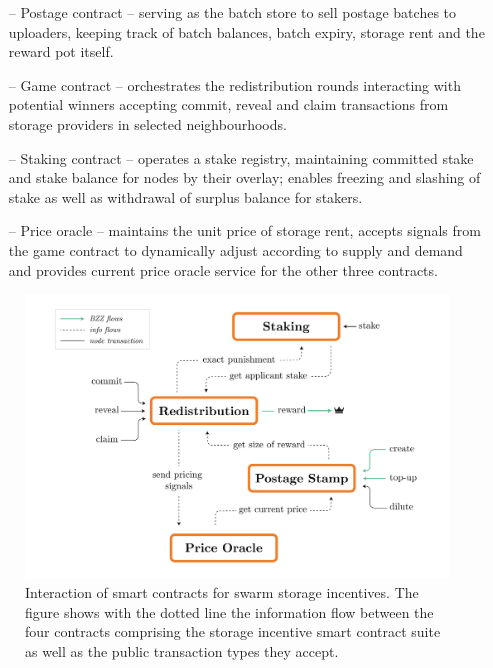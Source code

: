 \begin{itemize}
    \item[--] Postage contract -- serving as the batch store to sell postage batches to uploaders, keeping track of batch balances, batch expiry, storage rent and the reward pot itself.
    \item[--] Game contract -- orchestrates the redistribution rounds interacting with potential winners accepting commit, reveal and claim transactions from storage providers in selected neighbourhoods.
    \item[--] Staking contract -- operates a stake registry, maintaining committed stake and stake balance for nodes by their overlay; enables freezing and slashing of stake as well as withdrawal of surplus balance for stakers.
    \item[--] Price oracle -- maintains the unit price of  storage rent, accepts signals from the game contract to dynamically adjust according to supply and demand and provides current price oracle service for the other three contracts.
\end{itemize}


\begin{figure}[!ht]
  \centering
     \includegraphics[width=\textwidth]{fig/smart-contract-interaction.pdf}
  \caption[Interaction of smart contracts for swarm storage incentives]{Interaction of smart contracts for swarm storage incentives. The figure shows with the dotted line the information flow between the four contracts comprising the storage incentive smart contract suite as well as the public transaction types they accept. }
\label{fig:smart-contracts}
\end{figure}    

